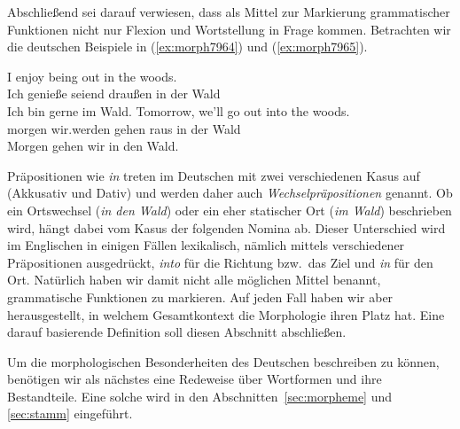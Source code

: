 Abschließend sei darauf verwiesen, dass als Mittel zur Markierung grammatischer Funktionen nicht nur Flexion und Wortstellung in Frage kommen.
Betrachten wir die deutschen Beispiele in (\ref{ex:morph7964}) und (\ref{ex:morph7965}).

\begin{exe}
  \ex \label{ex:morph7964}
  \begin{xlist}
  \end{xlist}
  \ex \label{ex:morph7965}
  \begin{xlist}
    \ex\gll I enjoy being out in the woods.\\
    Ich genieße seiend draußen in der Wald\\
    \glt Ich bin gerne im Wald. 
    \ex\gll Tomorrow, {we'll} go out into the woods.\\
    morgen {wir.werden} gehen raus in der Wald\\
    \glt Morgen gehen wir in den Wald.
  \end{xlist}
\end{exe}


Präpositionen wie \textit{in} treten im Deutschen mit zwei verschiedenen Kasus auf (Akkusativ und Dativ) und werden daher auch \textit{Wechselpräpositionen} genannt.
Ob ein Ortswechsel (\textit{in den Wald}) oder ein eher statischer Ort (\textit{im Wald}) beschrieben wird, hängt dabei vom Kasus der folgenden Nomina ab.
Dieser Unterschied wird \zB im Englischen in einigen Fällen lexikalisch, nämlich mittels verschiedener Präpositionen ausgedrückt, \textit{into} für die Richtung bzw.\ das Ziel und \textit{in} für den Ort.
Natürlich haben wir damit nicht alle möglichen Mittel benannt, grammatische Funktionen zu markieren.
Auf jeden Fall haben wir aber herausgestellt, in welchem Gesamtkontext die Morphologie ihren Platz hat.
Eine darauf basierende Definition soll diesen Abschnitt abschließen.


Um die morphologischen Besonderheiten des Deutschen beschreiben zu können, benötigen wir als nächstes eine Redeweise über Wortformen und ihre Bestandteile.
Eine solche wird in den Abschnitten~\ref{sec:morpheme} und \ref{sec:stamm} eingeführt.

